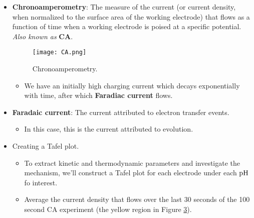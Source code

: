\documentclass[../notes.tex]{subfiles}
\begin{document}
\begin{itemize}
\begin{figure}[h!]
\begin{subfigure}[b]{0.45\linewidth}
            \centering
            \texttt{[image: CVb.png]}
            \caption{Cyclic voltammagram.}
            \label{fig:CVb}
        \end{subfigure}
        \caption{Cyclic voltammetry.}
        \label{fig:CV}
    \end{figure}
    \begin{itemize}
        \item Figure \ref{fig:CVa} shows the potentials we sweep over, first negative and then positive, as time progresses. Notice that this change in potential is mirrored by the grey arrows in Figure \ref{fig:CVb}.
        \item Figure \ref{fig:CVb} shows the cyclic voltammagram. The black points lie along the foot of the wave and are where we want to collect CA data. They correspond to overpotentials that induce catalysis.
    \end{itemize}
    \item \textbf{Chronoamperometry}: The measure of the current (or current density, when normalized to the surface area of the working electrode) that flows as a function of time when a working electrode is poised at a specific potential. \emph{Also known as} \textbf{CA}.
    \begin{figure}[h!]
        \centering
        \texttt{[image: CA.png]}
        \caption{Chronoamperometry.}
        \label{fig:CA}
    \end{figure}
    \begin{itemize}
        \item We have an initially high charging current which decays exponentially with time, after which \textbf{Faradiac current} flows.
    \end{itemize}
    \item \textbf{Faradaic current}: The current attributed to electron transfer events.
    \begin{itemize}
        \item In this case, this is the current attributed to  evolution.
    \end{itemize}
    \item Creating a Tafel plot.
    \begin{itemize}
        \item To extract kinetic and thermodynamic parameters and investigate the mechanism, we'll construct a Tafel plot for each electrode under each $\operatorname{pH}$ fo interest.
        \item Average the current density that flows over the last 30 seconds of the 100 second CA experiment (the yellow region in Figure \ref{fig:CA}).

\end{itemize}
\end{itemize}
\end{document}
